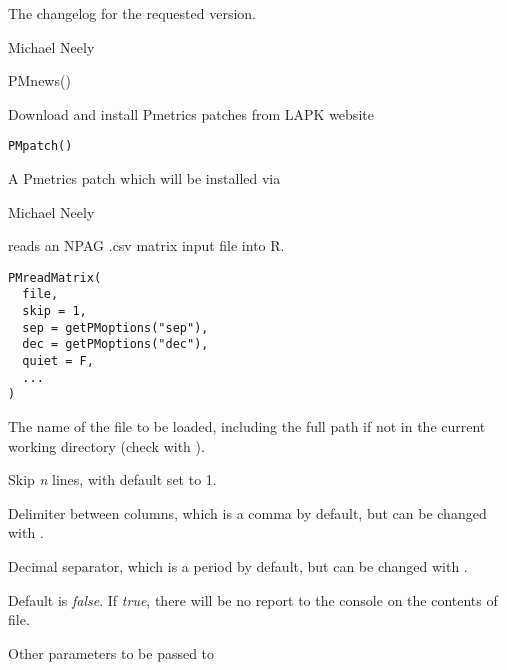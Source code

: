 \documentclass[a4paper]{book}
\begin{document}
%
\begin{Value}
The changelog for the requested version.
\end{Value}
%
\begin{Author}\relax
Michael Neely
\end{Author}
%
\begin{Examples}
\begin{ExampleCode}
PMnews()
\end{ExampleCode}
\end{Examples}
%
\begin{Description}\relax
Download and install Pmetrics patches from LAPK website
\end{Description}
%
\begin{Usage}
\begin{verbatim}
PMpatch()
\end{verbatim}
\end{Usage}
%
\begin{Value}
A Pmetrics patch which will be installed via 
\end{Value}
%
\begin{Author}\relax
Michael Neely
\end{Author}
%
\begin{Description}\relax
{} reads an NPAG .csv matrix input file into R.
\end{Description}
%
\begin{Usage}
\begin{verbatim}
PMreadMatrix(
  file,
  skip = 1,
  sep = getPMoptions("sep"),
  dec = getPMoptions("dec"),
  quiet = F,
  ...
)
\end{verbatim}
\end{Usage}
%
\begin{Arguments}
\begin{ldescription}
\item[\code{file}] The name of the file to be loaded, including the full path if not
in the current working directory (check with ).

\item[\code{skip}] Skip \emph{n} lines, with default set to 1.

\item[\code{sep}] Delimiter between columns, which is a comma by default, but can be changed with
.

\item[\code{dec}] Decimal separator, which is a period by default, but can be changed with
.

\item[\code{quiet}] Default is \emph{false}.  If \emph{true}, there will be no report to
the console on the contents of file.

\item[\code{...}] Other parameters to be passed to 
\end{ldescription}
\end{Arguments}
\end{document}
